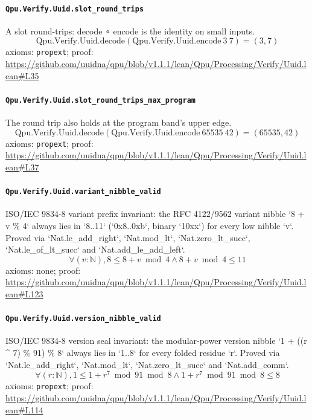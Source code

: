 \documentclass[11pt]{article}
\begin{document}
\paragraph{\texttt{Qpu.Verify.Uuid.slot\_round\_trips}}
A slot round-trips: decode ∘ encode is the identity on small inputs.
\[ \mathrm{Qpu.Verify.Uuid.decode} (\mathrm{Qpu.Verify.Uuid.encode}\ 3\ 7) = (3, 7) \]
\noindent axioms: \texttt{propext}; proof: \url{https://github.com/uuidna/qpu/blob/v1.1.1/lean/Qpu/Processing/Verify/Uuid.lean\#L35}

\paragraph{\texttt{Qpu.Verify.Uuid.slot\_round\_trips\_max\_program}}
The round trip also holds at the program band's upper edge.
\[ \mathrm{Qpu.Verify.Uuid.decode} (\mathrm{Qpu.Verify.Uuid.encode}\ 65535\ 42) = (65535, 42) \]
\noindent axioms: \texttt{propext}; proof: \url{https://github.com/uuidna/qpu/blob/v1.1.1/lean/Qpu/Processing/Verify/Uuid.lean\#L37}

\paragraph{\texttt{Qpu.Verify.Uuid.variant\_nibble\_valid}}
ISO/IEC 9834-8 variant prefix invariant: the RFC 4122/9562 variant nibble `8 + v \% 4` always lies in `8..11` (`0x8..0xb`, binary `10xx`) for every low nibble `v`. Proved via `Nat.le\_add\_right`, `Nat.mod\_lt`, `Nat.zero\_lt\_succ`, `Nat.le\_of\_lt\_succ` and `Nat.add\_le\_add\_left`.
\[ \forall (v : \mathbb{N}), 8 \le 8 + v \bmod 4 \land 8 + v \bmod 4 \le 11 \]
\noindent axioms: none; proof: \url{https://github.com/uuidna/qpu/blob/v1.1.1/lean/Qpu/Processing/Verify/Uuid.lean\#L123}

\paragraph{\texttt{Qpu.Verify.Uuid.version\_nibble\_valid}}
ISO/IEC 9834-8 version seal invariant: the modular-power version nibble `1 + ((r \^{} 7) \% 91) \% 8` always lies in `1..8` for every folded residue `r`. Proved via `Nat.le\_add\_right`, `Nat.mod\_lt`, `Nat.zero\_lt\_succ` and `Nat.add\_comm`.
\[ \forall (r : \mathbb{N}), 1 \le 1 + r ^{7} \bmod 91 \bmod 8 \land 1 + r ^{7} \bmod 91 \bmod 8 \le 8 \]
\noindent axioms: \texttt{propext}; proof: \url{https://github.com/uuidna/qpu/blob/v1.1.1/lean/Qpu/Processing/Verify/Uuid.lean\#L114}
\end{document}
